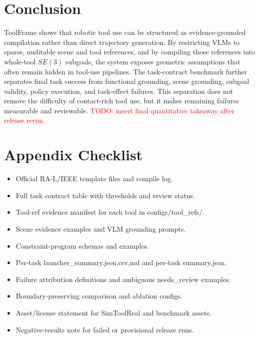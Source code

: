 \documentclass[journal]{IEEEtran}
\newcommand{\todo}[1]{\textcolor{red}{TODO: #1}}
\newcommand{\method}{ToolFrame}
\begin{document}
\section{Conclusion}
\method{} shows that robotic tool use can be structured as evidence-grounded
compilation rather than direct trajectory generation. By restricting VLMs to
sparse, auditable scene and tool references, and by compiling those references
into whole-tool $SE(3)$ subgoals, the system exposes geometric assumptions that
often remain hidden in tool-use pipelines. The task-contract benchmark further
separates final task success from functional grounding, scene grounding,
subgoal validity, policy execution, and task-effect failures. This separation
does not remove the difficulty of contact-rich tool use, but it makes remaining
failures measurable and reviewable. \todo{insert final quantitative takeaway
after release rerun.}

\appendices
\section{Appendix Checklist}
\begin{itemize}
  \item Official RA-L/IEEE template files and compile log.
  \item Full task contract table with thresholds and review status.
  \item Tool-ref evidence manifest for each tool in configs/tool\_refs/.
  \item Scene evidence examples and VLM grounding prompts.
  \item Constraint-program schemas and examples.
  \item Per-task launcher\_summary.{json,csv,md} and per-task summary.json.
  \item Failure attribution definitions and ambiguous needs\_review examples.
  \item Boundary-preserving comparison and ablation configs.
  \item Asset/license statement for SimToolReal and benchmark assets.
  \item Negative-results note for failed or provisional release runs.
\end{itemize}
\end{document}
